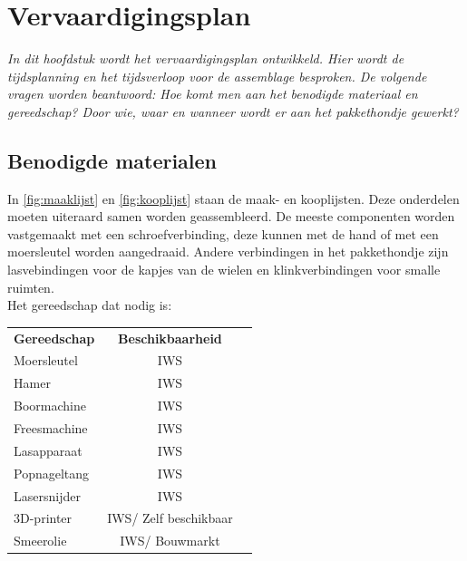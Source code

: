 
\chapter{Vervaardigingsplan}
\label{Vervaardigingsplan}
\textit{In dit hoofdstuk wordt het vervaardigingsplan ontwikkeld. Hier wordt de tijdsplanning en het tijdsverloop voor de assemblage besproken. De volgende vragen worden beantwoord: Hoe komt men aan het benodigde materiaal en gereedschap? Door wie, waar en wanneer wordt er aan het pakkethondje gewerkt?}

\section{Benodigde materialen}
\label{Benodigde_materialen}
In \cref{fig:maaklijst} en \cref{fig:kooplijst} staan de maak- en kooplijsten. Deze onderdelen moeten uiteraard samen worden geassembleerd. De meeste componenten worden vastgemaakt met een schroefverbinding, deze kunnen met de hand of met een moersleutel worden aangedraaid. Andere verbindingen in het pakkethondje zijn lasvebindingen voor de kapjes van de wielen en klinkverbindingen voor smalle ruimten. \\
\vspace{\baselineskip}
Het gereedschap dat nodig is:
\begin{center}
 \begin{tabular}{| l | c | r |}  
 \hline
\textbf{Gereedschap} & \textbf{Beschikbaarheid} \\
  Moersleutel          & IWS                      \\
  Hamer                & IWS                      \\
  Boormachine          & IWS                      \\
  Freesmachine         & IWS                      \\
  Lasapparaat          & IWS                      \\
  Popnageltang         & IWS                      \\
  Lasersnijder         & IWS                      \\
  3D-printer           & IWS/ Zelf beschikbaar    \\
  Smeerolie            & IWS/ Bouwmarkt       \\
  \hline
 \end{tabular}
\end{center}

